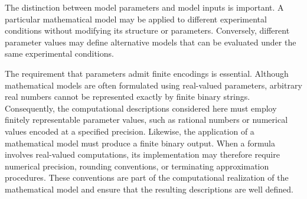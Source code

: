 The distinction between model parameters and model inputs is important. A particular mathematical model may be applied to different experimental conditions without modifying its structure or parameters. Conversely, different parameter values may define alternative models that can be evaluated under the same experimental conditions.

The requirement that parameters admit finite encodings is essential. Although mathematical models are often formulated using real-valued parameters, arbitrary real numbers cannot be represented exactly by finite binary strings. Consequently, the computational descriptions considered here must employ finitely representable parameter values, such as rational numbers or numerical values encoded at a specified precision. Likewise, the application of a mathematical model must produce a finite binary output. When a formula involves real-valued computations, its implementation may therefore require numerical precision, rounding conventions, or terminating approximation procedures. These conventions are part of the computational realization of the mathematical model and ensure that the resulting descriptions are well defined.

